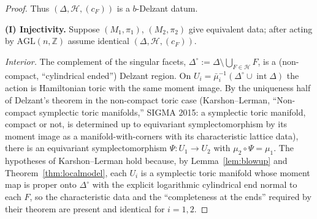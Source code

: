 \documentclass{amsart}
\theoremstyle{definition}
\begin{document}
\begin{proof}
Thus $(\Delta,\mathcal H,(c_F))$ is a $b$-Delzant datum.

\medskip
\noindent\textbf{(I) Injectivity.}
Suppose $(M_1,\pi_1)$, $(M_2,\pi_2)$ give equivalent data; after acting by
$\mathrm{AGL}(n,\mathbb Z)$ assume identical $(\Delta,\mathcal H,(c_F))$.

\emph{Interior.} The complement of the singular facets, $\Delta^\circ:=
\Delta\setminus\bigcup_{F\in\mathcal H}F$, is a (non-compact, ``cylindrical
ended'') Delzant region. On $U_i=\bar\mu_i^{-1}(\Delta^\circ\cup\operatorname
{int}\Delta)$ the action is Hamiltonian toric with the same moment image. By the
uniqueness half of Delzant's theorem in the non-compact toric case (Karshon--Lerman,
``Non-compact symplectic toric manifolds,'' SIGMA 2015: a symplectic toric
manifold, compact or not, is determined up to equivariant symplectomorphism by
its moment image as a manifold-with-corners with its characteristic lattice
data), there is an equivariant symplectomorphism $\Psi\colon U_1\to U_2$ with
$\mu_2\circ\Psi=\mu_1$. The hypotheses of Karshon--Lerman hold because, by
Lemma~\ref{lem:blowup} and Theorem~\ref{thm:localmodel}, each $U_i$ is a
symplectic toric manifold whose moment map is proper onto $\Delta^\circ$ with
the explicit logarithmic cylindrical end normal to each $F$, so the
characteristic data and the ``completeness at the ends'' required by their
theorem are present and identical for $i=1,2$.


\end{proof}
\end{document}

